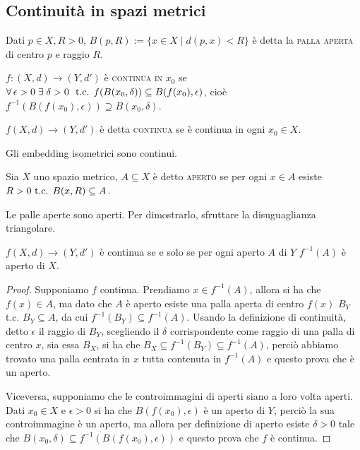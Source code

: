 \documentclass{article}
\begin{document}
\subsection{Continuità in spazi metrici}
\begin{defn}
Dati $p \in X, R>0$, ${B(p, R):=\{ x \in X \mid d(p, x)<R\}}$ è detta la
\textsc{palla aperta} di centro $p$ e raggio $R$.
\end{defn}

\begin{defn}
${f:(X, d) \rightarrow (Y, d')}$ è \textsc{continua in $x_0$} se
${\forall \epsilon > 0 \; \exists \; \delta >0}\\\ \tc {f(B(x_0, \delta))
\subseteq B(f(x_0), \epsilon)}$, cioè ${f^{-1}(B(f(x_0), \epsilon)) \supseteq
B(x_0, \delta)}$.
\end{defn}

\begin{defn}
${f(X, d) \rightarrow (Y, d')}$ è detta \textsc{continua} se è continua in ogni
${x_0 \in X}$.
\end{defn}

\begin{oss}
Gli embedding isometrici sono continui.
\end{oss}

\begin{defn}
Sia $X$ uno spazio metrico, $A \subseteq X$ è detto \textsc{aperto} se per ogni
$x \in A$ esiste ${R>0 \text{ t.c. } B(x, R) \subseteq A}$.
\end{defn}

\begin{ftt}
Le palle aperte sono aperti. Per dimostrarlo, sfruttare la disuguaglianza
triangolare.
\end{ftt}

\begin{thm} \label{thm:cont_inv}
$f(X, d) \rightarrow (Y, d')$ è continua se e solo se per ogni aperto $A$ di $Y$
$f^{-1}(A)$ è aperto di $X$.
\end{thm}

\begin{proof}
Supponiamo $f$ continua. Prendiamo $x \in f^{-1}(A)$, allora si ha che $f(x) \in
A$, ma dato che $A$ è aperto esiste una palla aperta di centro $f(x)$ $B_Y$ t.c.
$B_Y \subseteq A$, da cui $f^{-1}(B_Y) \subseteq f^{-1}(A)$. Usando la
definizione di continuità, detto $\epsilon$ il raggio di $B_Y$, scegliendo il
$\delta$ corrispondente come raggio di una palla di centro $x$, sia essa $B_X$,
si ha che $B_X \subseteq f^{-1}(B_Y) \subseteq f^{-1}(A)$, perciò abbiamo
trovato una palla centrata in $x$ tutta contenuta in $f^{-1}(A)$ e questo prova
che è un aperto.

Viceversa, supponiamo che le controimmagini di aperti siano a loro volta aperti.
Dati $x_0 \in X$ e $\epsilon >0$ si ha che $B(f(x_0), \epsilon)$ è un aperto di
$Y$, perciò la sua controimmagine è un aperto, ma allora per definizione di
aperto esiste $\delta>0$ tale che $B(x_0, \delta) \subseteq f^{-1}(B(f(x_0),
\epsilon))$ e questo prova che $f$ è continua.
\end{proof}
\end{document}
